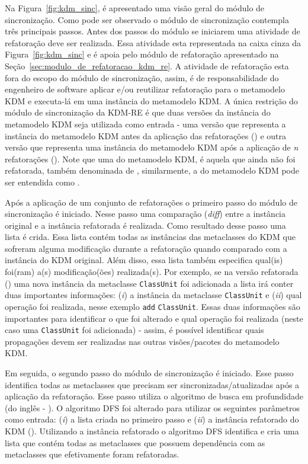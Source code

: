 Na Figura~\ref{fig:kdm_sinc}, é apresentado uma visão geral do módulo de sincronização. Como pode ser observado o módulo de sincronização contempla três principais passos. Antes dos passos do módulo se iniciarem uma atividade de refatoração deve ser realizada. Essa atividade esta representada na caixa cinza da Figura~\ref{fig:kdm_sinc}  e é apoia pelo módulo de refatoração apresentado na Seção~\ref{sec:modulo_de_refatoracao_kdm_re}. A atividade de refatoração esta fora do escopo do módulo de sincronização, assim, é de responsabilidade do engenheiro de software aplicar e/ou reutilizar refatoração para o metamodelo KDM e executa-lá em uma instância do metamodelo KDM. A única restrição do módulo de sincronização da KDM-RE é que duas versões da instância do metamodelo KDM seja utilizada como entrada - uma versão que representa a instância do metamodelo KDM antes da aplicação das refatorações () e outra versão que representa uma instância do metamodelo KDM após a aplicação de \textit{n} refatorações (). Note que uma  do metamodelo KDM, é aquela que ainda não foi refatorada, também denominada de , similarmente, a  do metamodelo KDM pode ser entendida como . 

Após a aplicação de um conjunto de refatorações o primeiro passo do módulo de sincronização é iniciado. Nesse passo uma comparação (\textit{diff}) entre a instância original e a instância refatorada é realizada. Como resultado desse passo uma lista é crida. Essa lista contém todas as instâncias das metaclasses do KDM que sofreram alguma modificação durante a refatoração quando comparado com a instância do KDM original. Além disso, essa lista também especifica qual(is) foi(ram) a(s) modificação(ões) realizada(s). Por exemplo, se na versão refatorada () uma nova instância da metaclasse \texttt{ClassUnit} foi adicionada a lista irá conter duas importantes informações: (\textit{i}) a instância da metaclasse \texttt{ClassUnit} e (\textit{ii}) qual operação foi realizada, nesse exemplo \texttt{add} \texttt{ClassUnit}. Essas duas informações são importantes para identificar o que foi alterado e qual operação foi realizada (neste caso uma \texttt{ClassUnit} foi adicionada) - assim, é possível identificar quais propagações devem ser realizadas nas outras visões/pacotes do metamodelo KDM.

Em seguida, o segundo passo do módulo de sincronização é iniciado. Esse passo identifica todas as metaclasses que precisam ser sincronizadas/atualizadas após a aplicação da refatoração. Esse passo utiliza o algoritmo de busca em profundidade (do inglês - ). O algoritmo DFS foi alterado para utilizar os seguintes parâmetros como entrada: (\textit{i}) a lista criada no primeiro passo e (\textit{ii}) a instância refatorado do KDM (). Utilizando a instância refatorado o algoritmo DFS identifica e cria uma lista que contém todas as metaclasses que possuem dependência com as metaclasses que efetivamente foram refatoradas.

